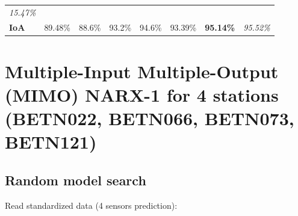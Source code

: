 \documentclass[11pt]{article}
\begin{document}
\begin{longtable}[]{@{}llllllll@{}}
\begin{minipage}[t]{0.10\columnwidth}
\emph{15.47\%}\strut
\end{minipage}\tabularnewline
\begin{minipage}[t]{0.10\columnwidth}\raggedright
\textbf{IoA}\strut
\end{minipage} & \begin{minipage}[t]{0.10\columnwidth}\raggedright
89.48\%\strut
\end{minipage} & \begin{minipage}[t]{0.10\columnwidth}\raggedright
88.6\%\strut
\end{minipage} & \begin{minipage}[t]{0.10\columnwidth}\raggedright
93.2\%\strut
\end{minipage} & \begin{minipage}[t]{0.10\columnwidth}\raggedright
94.6\%\strut
\end{minipage} & \begin{minipage}[t]{0.10\columnwidth}\raggedright
93.39\%\strut
\end{minipage} & \begin{minipage}[t]{0.10\columnwidth}\raggedright
\textbf{95.14\%}\strut
\end{minipage} & \begin{minipage}[t]{0.10\columnwidth}\raggedright
\emph{95.52\%}\strut
\end{minipage}\tabularnewline
\bottomrule
\end{longtable}

    \hypertarget{multiple-input-multiple-output-mimo-narx-1-for-4-stations-betn022-betn066-betn073-betn121}{%
\section{Multiple-Input Multiple-Output (MIMO) NARX-1 for 4 stations
(BETN022, BETN066, BETN073,
BETN121)}\label{multiple-input-multiple-output-mimo-narx-1-for-4-stations-betn022-betn066-betn073-betn121}}

    \hypertarget{random-model-search}{%
\subsection{Random model search}\label{random-model-search}}

    Read standardized data (4 sensors prediction):
\end{document}
